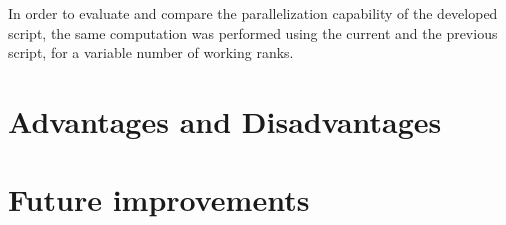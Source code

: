 In order to evaluate and compare the parallelization capability of the developed script, the same computation was performed using the current and the previous script, for a variable number of working ranks.


\section{Advantages and Disadvantages}



\section{Future improvements}
